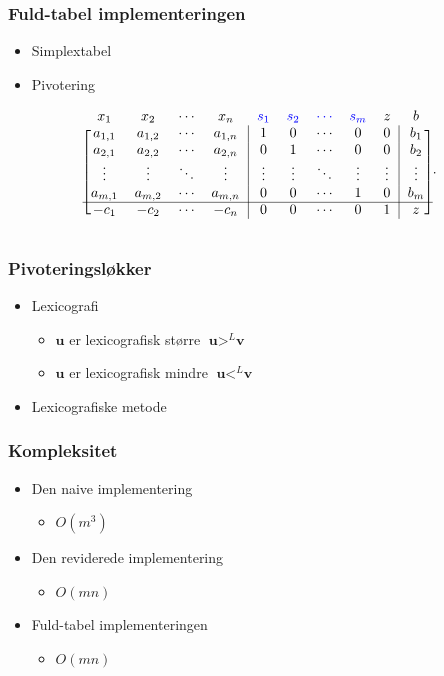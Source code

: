 \begin{frame}
\frametitle{Fuld-tabel implementeringen}
\begin{itemize}
\item Simplextabel 
\item Pivotering
\end{itemize}
\begin{align*}
\begin{blockarray}{ccccccccccc}
x_1 & x_2 & \cdots & x_n & \textcolor{blue}{s_1} & \textcolor{blue}{s_2} &  \textcolor{blue}{\cdots} & \textcolor{blue}{s_m} & z & b \\
\begin{block}{[cccc|ccccc|c]c}
a_{1,1} & a_{1,2} & \cdots & a_{1,n} & 1 & 0 & \cdots & 0 & 0 & b_1 \\
a_{2,1} & a_{2,2} & \cdots & a_{2,n} & 0 & 1 & \cdots & 0 & 0 & b_2 \\
\vdots & \vdots & \ddots & \vdots & \vdots & \vdots & \ddots & \vdots & \vdots & \vdots \\
a_{m,1} & a_{m,2} & \cdots & a_{m,n} & 0 & 0 & \cdots  & 1  & 0 & b_{m}\\
\cline{1-10}
-c_1 & -c_2 & \cdots & -c_n & 0 & 0 & \cdots & 0 & 1 & z\\
\end{block}
\end{blockarray}.
\end{align*}
\end{frame}

\begin{frame}
\frametitle{Pivoteringsløkker}
\begin{itemize}
\item Lexicografi
	\begin{itemize}
	\item $\mathbf{u}$ er lexicografisk større $\textbf{u} >^L \textbf{v}$
	\item $\mathbf{u}$ er lexicografisk mindre $ \textbf{u} <^L \textbf{v}$
	\end{itemize}
\item Lexicografiske metode 
\end{itemize}
\end{frame}

\begin{frame}
\frametitle{Kompleksitet}
\begin{itemize}
\item Den naive implementering 
	\begin{itemize}
	\item $O(m^3)$ 
	\end{itemize}
\item Den reviderede implementering 
	\begin{itemize}
	\item $O(mn)$
	\end{itemize}
\item Fuld-tabel implementeringen
	\begin{itemize}
	\item $O(mn)$
	\end{itemize} 
\end{itemize}
\end{frame}